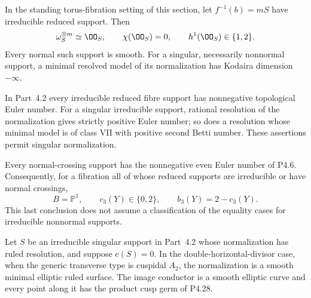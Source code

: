 
\begin{proposition}[P4.12]\hypertarget{tag-02WJ}{}\label{night:P4.12}\label{stmt:P4.12}


In the standing torus-fibration setting of this section, let $f^{-1}(b)=mS$
have irreducible reduced support. Then
\[
 \omega_S^{\otimes m}\simeq\OO_S,\qquad
 \chi(\OO_S)=0,\qquad h^1(\OO_S)\in\{1,2\}.
\]
Every normal such support is smooth. For a singular, necessarily
nonnormal support, a minimal resolved model of its normalization
has Kodaira dimension $-\infty$.
\end{proposition}

\begin{proposition}[P4.26]\hypertarget{tag-02WY}{}\label{night:P4.26}\label{stmt:P4.26}


In Part~4.2 every irreducible reduced fibre support
has nonnegative topological Euler number. For a
singular irreducible support, rational resolution
of the normalization gives strictly positive
Euler number; so does a resolution whose minimal
model is of class VII with positive second
Betti number. These assertions permit singular
normalization.

Every normal-crossing support has the
nonnegative even Euler number of P4.6.
Consequently, for a fibration all of whose
reduced supports are irreducible or have
normal crossings,
\[
 B=\mathbb P^1,\qquad c_3(Y)\in\{0,2\},
 \qquad b_3(Y)=2-c_3(Y).
\]
This last conclusion does not assume a
classification of the equality cases for
irreducible nonnormal supports.
\end{proposition}

\begin{proposition}[P4.29]\hypertarget{tag-02X1}{}\label{night:P4.29}\label{stmt:P4.29}


Let $S$ be an irreducible singular support
in Part~4.2 whose normalization has ruled
resolution, and suppose $e(S)=0$.
In the double-horizontal-divisor case,
when the generic transverse type is
cuspidal $A_2$, the normalization is
a smooth minimal elliptic ruled surface.
The image conductor is a smooth elliptic
curve and every point along it has the
product cusp germ of P4.28.
\end{proposition}

